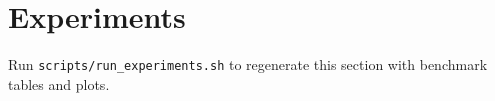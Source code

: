\section{Experiments}
Run \texttt{scripts/run_experiments.sh} to regenerate this section with benchmark tables and plots.
